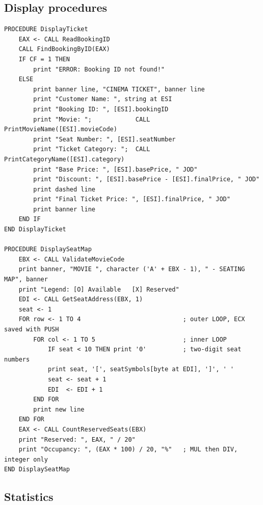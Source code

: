 \documentclass{thesis-library}
\begin{document}
\subsection{Display procedures}

\begin{lstlisting}
PROCEDURE DisplayTicket
    EAX <- CALL ReadBookingID
    CALL FindBookingByID(EAX)
    IF CF = 1 THEN
        print "ERROR: Booking ID not found!"
    ELSE
        print banner line, "CINEMA TICKET", banner line
        print "Customer Name: ", string at ESI
        print "Booking ID: ", [ESI].bookingID
        print "Movie: ";            CALL PrintMovieName([ESI].movieCode)
        print "Seat Number: ", [ESI].seatNumber
        print "Ticket Category: ";  CALL PrintCategoryName([ESI].category)
        print "Base Price: ", [ESI].basePrice, " JOD"
        print "Discount: ", [ESI].basePrice - [ESI].finalPrice, " JOD"
        print dashed line
        print "Final Ticket Price: ", [ESI].finalPrice, " JOD"
        print banner line
    END IF
END DisplayTicket

PROCEDURE DisplaySeatMap
    EBX <- CALL ValidateMovieCode
    print banner, "MOVIE ", character ('A' + EBX - 1), " - SEATING MAP", banner
    print "Legend: [O] Available   [X] Reserved"
    EDI <- CALL GetSeatAddress(EBX, 1)
    seat <- 1
    FOR row <- 1 TO 4                            ; outer LOOP, ECX saved with PUSH
        FOR col <- 1 TO 5                        ; inner LOOP
            IF seat < 10 THEN print '0'          ; two-digit seat numbers
            print seat, '[', seatSymbols[byte at EDI], ']', ' '
            seat <- seat + 1
            EDI  <- EDI + 1
        END FOR
        print new line
    END FOR
    EAX <- CALL CountReservedSeats(EBX)
    print "Reserved: ", EAX, " / 20"
    print "Occupancy: ", (EAX * 100) / 20, "%"   ; MUL then DIV, integer only
END DisplaySeatMap
\end{lstlisting}

\subsection{Statistics}
\end{document}
